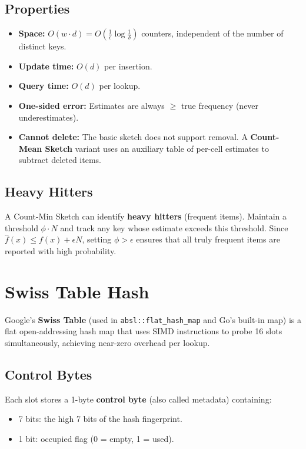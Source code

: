\subsection{Properties}

\begin{itemize}
\item \textbf{Space:} $O(w \cdot d) = O(\frac{1}{\epsilon} \log \frac{1}{\delta})$ counters, independent of the number of distinct keys.
\item \textbf{Update time:} $O(d)$ per insertion.
\item \textbf{Query time:} $O(d)$ per lookup.
\item \textbf{One-sided error:} Estimates are always $\geq$ true frequency (never underestimates).
\item \textbf{Cannot delete:} The basic sketch does not support removal. A \textbf{Count-Mean Sketch} variant uses an auxiliary table of per-cell estimates to subtract deleted items.
\end{itemize}

\subsection{Heavy Hitters}

A Count-Min Sketch can identify \textbf{heavy hitters} (frequent items). Maintain a threshold $\phi \cdot N$ and track any key whose estimate exceeds this threshold. Since $\hat{f}(x) \leq f(x) + \epsilon N$, setting $\phi > \epsilon$ ensures that all truly frequent items are reported with high probability.

\section{Swiss Table Hash}

Google's \textbf{Swiss Table} (used in \texttt{absl::flat\_hash\_map} and Go's built-in map) is a flat open-addressing hash map that uses SIMD instructions to probe 16 slots simultaneously, achieving near-zero overhead per lookup.

\subsection{Control Bytes}

Each slot stores a 1-byte \textbf{control byte} (also called metadata) containing:
\begin{itemize}
\item 7 bits: the high 7 bits of the hash fingerprint.
\item 1 bit: occupied flag (0 = empty, 1 = used).
\end{itemize}

